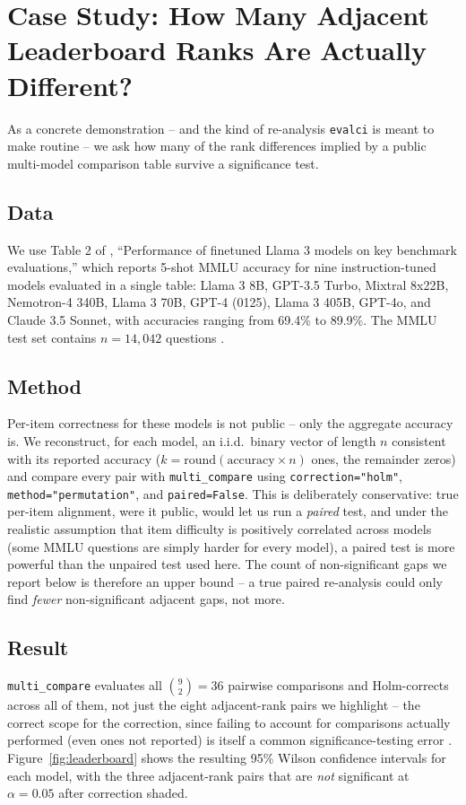 \documentclass[11pt]{article}
\begin{document}
\section{Case Study: How Many Adjacent Leaderboard Ranks Are Actually Different?}
\label{sec:case-study}

As a concrete demonstration -- and the kind of re-analysis \texttt{evalci} is
meant to make routine -- we ask how many of the rank differences implied by a
public multi-model comparison table survive a significance test.

\subsection{Data}
We use Table 2 of \citet{grattafiori2024}, ``Performance of finetuned Llama 3
models on key benchmark evaluations,'' which reports 5-shot MMLU accuracy for
nine instruction-tuned models evaluated in a single table: Llama 3 8B, GPT-3.5
Turbo, Mixtral 8x22B, Nemotron-4 340B, Llama 3 70B, GPT-4 (0125), Llama 3 405B,
GPT-4o, and Claude 3.5 Sonnet, with accuracies ranging from 69.4\% to 89.9\%.
The MMLU test set contains $n=14{,}042$ questions \citep{hendrycks2021}.

\subsection{Method}
Per-item correctness for these models is not public -- only the aggregate
accuracy is. We reconstruct, for each model, an i.i.d.\ binary vector of
length $n$ consistent with its reported accuracy ($k=\mathrm{round}(\text{accuracy}\times n)$
ones, the remainder zeros) and compare every pair with \texttt{multi\_compare}
using \texttt{correction="holm"}, \texttt{method="permutation"}, and
\texttt{paired=False}. This is deliberately conservative: true per-item alignment,
were it public, would let us run a \emph{paired} test, and under the
realistic assumption that item difficulty is positively correlated across
models (some MMLU questions are simply harder for every model), a paired test
is more powerful than the unpaired test used here. The count of
non-significant gaps we report below is therefore an upper bound -- a true
paired re-analysis could only find \emph{fewer} non-significant adjacent
gaps, not more.

\subsection{Result}
\texttt{multi\_compare} evaluates all $\binom{9}{2}=36$ pairwise comparisons
and Holm-corrects across all of them, not just the eight adjacent-rank pairs
we highlight -- the correct scope for the correction, since failing to account
for comparisons actually performed (even ones not reported) is itself a
common significance-testing error \citep{dror2018}. Figure~\ref{fig:leaderboard}
shows the resulting 95\% Wilson confidence intervals for each model, with the
three adjacent-rank pairs that are \emph{not} significant at $\alpha=0.05$
after correction shaded.
\end{document}

